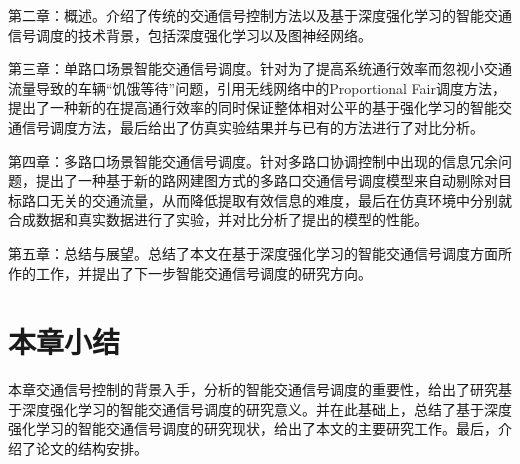 第二章：概述。介绍了传统的交通信号控制方法以及基于深度强化学习的智能交通信号调度的技术背景，包括深度强化学习以及图神经网络。

第三章：单路口场景智能交通信号调度。针对为了提高系统通行效率而忽视小交通流量导致的车辆“饥饿等待”问题，引用无线网络中的Proportional Fair调度方法，提出了一种新的在提高通行效率的同时保证整体相对公平的基于强化学习的智能交通信号调度方法，最后给出了仿真实验结果并与已有的方法进行了对比分析。

第四章：多路口场景智能交通信号调度。针对多路口协调控制中出现的信息冗余问题，提出了一种基于新的路网建图方式的多路口交通信号调度模型来自动剔除对目标路口无关的交通流量，从而降低提取有效信息的难度，最后在仿真环境中分别就合成数据和真实数据进行了实验，并对比分析了提出的模型的性能。

第五章：总结与展望。总结了本文在基于深度强化学习的智能交通信号调度方面所作的工作，并提出了下一步智能交通信号调度的研究方向。


\section{本章小结}
本章交通信号控制的背景入手，分析的智能交通信号调度的重要性，给出了研究基于深度强化学习的智能交通信号调度的研究意义。并在此基础上，总结了基于深度强化学习的智能交通信号调度的研究现状，给出了本文的主要研究工作。最后，介绍了论文的结构安排。